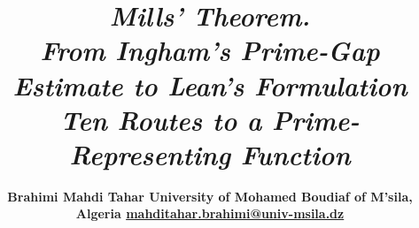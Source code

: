 \documentclass[11pt,reqno]{amsart}
\makeatletter
\theoremstyle{redplain}
\let\orig@maketitle\maketitle
\renewcommand{\maketitle}{\begingroup\let\MakeUppercase\@firstofone\let\uppercase\@firstofone\orig@maketitle\endgroup}
\numberwithin{equation}{section}
\makeatother
\begin{document}
\title{\bfseries{\huge \emph{Mills' Theorem.}}\\
[12pt]{\Large \emph{From Ingham's Prime-Gap Estimate to Lean's Formulation}} 
\\
[6pt]{\Large \emph{Ten Routes to a Prime-Representing Function}}}
\author{ 
\bfseries{\large \hspace{1.2in} Brahimi Mahdi Tahar\newline\text{ \ 
			} \newline\text{ \  } \hspace{0.5in}\text{ \  } University of Mohamed
			Boudiaf of M'sila, Algeria\newline\text{ \  }
			\newline\href{mailto:mahditahar.brahimi@univ-msila.dz}{mahditahar.brahimi@univ-msila.dz}}
}
\maketitle
\end{document}
